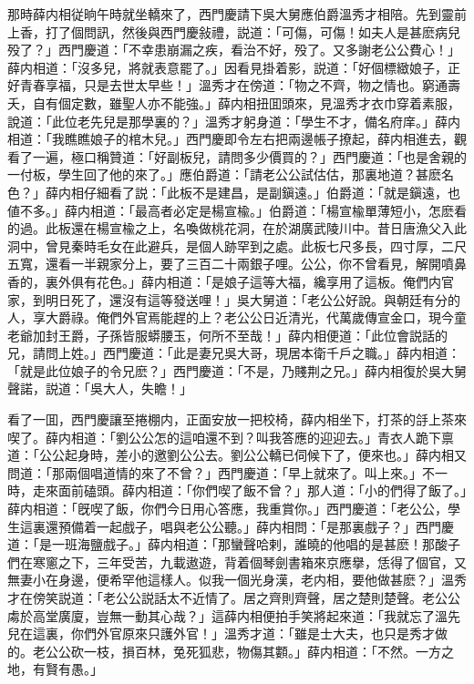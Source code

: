 那時薛内相従晌午時就坐轎來了，西門慶請下吳大舅應伯爵溫秀才相陪。先到靈前上香，打了個問訊，然後與西門慶敍禮，説道：「可傷，可傷！如夫人是甚麽病兒殁了？」西門慶道：「不幸患崩漏之疾，看治不好，殁了。又多謝老公公費心！」薛内相道：「沒多兒，將就表意罷了。」因看見掛着影，説道：「好個標緻娘子，正好青春享福，只是去世太早些！」溫秀才在傍道：「物之不齊，物之情也。窮通壽夭，自有個定數，雖聖人亦不能強。」薛内相扭囬頭來，見溫秀才衣巾穿着素服，說道：「此位老先兒是那學裏的？」溫秀才躬身道：「學生不才，備名府庠。」薛内相道：「我瞧瞧娘子的棺木兒。」西門慶即令左右把兩邊帳子撩起，薛内相進去，觀看了一遍，極口稱贊道：「好副板兒，請問多少價買的？」西門慶道：「也是舍親的一付板，學生回了他的來了。」應伯爵道：「請老公公試估估，那裏地道？甚麽名色？」薛内相仔細看了説：「此板不是建昌，是副鎭遠。」伯爵道：「就是鎭遠，也値不多。」薛内相道：「最高者必定是楊宣楡。」伯爵道：「楊宣楡單薄短小，怎麽看的過。此板還在楊宣楡之上，名喚做桃花洞，在於湖廣武陵川中。昔日唐漁父入此洞中，曾見秦時毛女在此避兵，是個人跡罕到之處。此板七尺多長，四寸厚，二尺五寬，還看一半親家分上，要了三百二十兩銀子哩。公公，你不曾看見，解開噴鼻香的，裏外俱有花色。」薛内相道：「是娘子這等大福，纔享用了這板。俺們内官家，到明日死了，還沒有這等發送哩！」吳大舅道：「老公公好說。與朝廷有分的人，享大爵祿。俺們外官焉能趕的上？老公公日近清光，代萬歲傳宣金口，現今童老爺加封王爵，子孫皆服蟒腰玉，何所不至哉！」薛内相便道：「此位會説話的兄，請問上姓。」西門慶道：「此是妻兄吳大哥，現居本衛千戶之職。」薛内相道：「就是此位娘子的令兄麽？」西門慶道：「不是，乃賤荆之兄。」薛内相復於吳大舅聲諾，説道：「吳大人，失瞻！」

看了一囬，西門慶讓至捲棚内，正面安放一把校椅，薛内相坐下，打茶的㧱上茶來喫了。薛内相道：「劉公公怎的這咱還不到？叫我答應的迎迎去。」青衣人跪下禀道：「公公起身時，差小的邀劉公公去。劉公公轎已伺候下了，便來也。」薛内相又問道：「那兩個唱道情的來了不曾？」西門慶道：「早上就來了。叫上來。」不一時，走來面前磕頭。薛内相道：「你們喫了飯不曾？」那人道：「小的們得了飯了。」薛内相道：「旣喫了飯，你們今日用心答應，我重賞你。」西門慶道：「老公公，學生這裏還預備着一起戲子，唱與老公公聽。」薛内相問：「是那裏戲子？」西門慶道：「是一班海鹽戲子。」薛内相道：「那蠻聲哈剌，誰曉的他唱的是甚麽！那酸子們在寒窻之下，三年受苦，九載遨遊，背着個琴劍書箱來京應擧，恁得了個官，又無妻小在身邊，便希罕他這樣人。似我一個光身漢，老内相，要他做甚麽？」溫秀才在傍笑説道：「老公公説話太不近情了。居之齊則齊聲，居之楚則楚聲。老公公䖏於高堂廣廈，豈無一動其心哉？」這薛内相便拍手笑將起來道：「我就忘了溫先兒在這裏，你們外官原來只護外官！」溫秀才道：「雖是士大夫，也只是秀才做的。老公公砍一枝，損百林，兔死狐悲，物傷其䫫。」薛内相道：「不然。一方之地，有賢有愚。」

